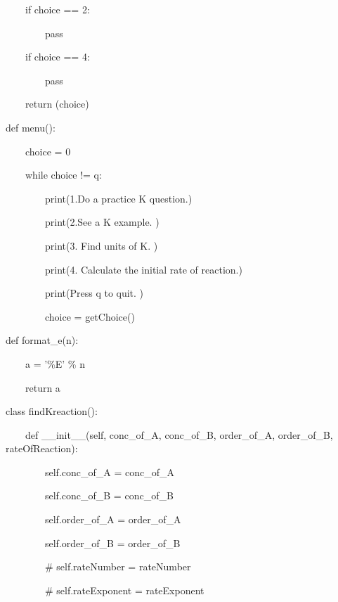 \documentclass{article}
\begin{document}
\ \ \ \ if choice == {\textquotedbl}2{\textquotedbl}:

\ \ \ \ \ \ \ \ pass

\ \ \ \ if choice == {\textquotedbl}4{\textquotedbl}:

\ \ \ \ \ \ \ \ pass

\ \ \ \ return (choice)


\bigskip


\bigskip

def menu():

\ \ \ \ choice = 0


\bigskip


\bigskip

\ \ \ \ while choice != {\textquotedbl}q{\textquotedbl}:

\ \ \ \ \ \ \ \ print({\textquotedbl}1.Do a practice K question.{\textquotedbl})

\ \ \ \ \ \ \ \ print({\textquotedbl}2.See a K example. {\textquotedbl})

\ \ \ \ \ \ \ \ print({\textquotedbl}3. Find units of K. {\textquotedbl})

\ \ \ \ \ \ \ \ print({\textquotedbl}4. Calculate the initial rate of reaction.{\textquotedbl})

\ \ \ \ \ \ \ \ print({\textquotedbl}Press q to quit. {\textquotedbl})

\ \ \ \ \ \ \ \ choice = getChoice()


\bigskip


\bigskip

def format\_e(n):

\ \ \ \ a = '\%E' \% n

\ \ \ \ return a


\bigskip


\bigskip

class findKreaction():

\ \ \ \ def \_\_init\_\_(self, conc\_of\_A, conc\_of\_B, order\_of\_A, order\_of\_B, rateOfReaction):

\ \ \ \ \ \ \ \ self.conc\_of\_A = conc\_of\_A

\ \ \ \ \ \ \ \ self.conc\_of\_B = conc\_of\_B

\ \ \ \ \ \ \ \ self.order\_of\_A = order\_of\_A

\ \ \ \ \ \ \ \ self.order\_of\_B = order\_of\_B

\ \ \ \ \ \ \ \ \# self.rateNumber = rateNumber

\ \ \ \ \ \ \ \ \# self.rateExponent = rateExponent
\end{document}
